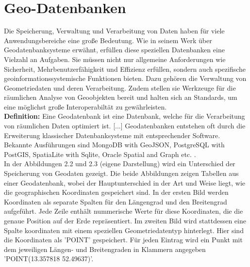 \section{Geo-Datenbanken}

Die Speicherung, Verwaltung und Verarbeitung von Daten haben für viele Anwendungsbereiche eine große Bedeutung.  Wie \cite{brinkhoff_geodatenbanksysteme_2022} in seinem Werk über Geodatenbanksysteme erwähnt, erfüllen diese speziellen Datenbanken eine Vielzahl an Aufgaben. Sie müssen nicht nur allgemeine Anforderungen wie Sicherheit, Mehrbenutzerfähigkeit und Effizienz erfüllen, sondern auch spezifische geoinformationssystemische Funktionen bieten. Dazu gehören die Verwaltung von Geometriedaten und deren Verarbeitung. Zudem stellen sie Werkzeuge für die räumlichen Analyse von Geoobjekten bereit und halten sich an Standards, um eine möglichst große Interoperabiltät zu gewährleisten. \\

\textbf{Definition: }Eine Geodatenbank ist eine Datenbank, welche für die Verarbeitung von räumlichen Daten optimiert ist. [...] Geodatenbanken entstehen oft durch die Erweiterung klassischer Datenbanksysteme mit entsprechender Software. Bekannte Ausführungen sind MongoDB with GeoJSON, PostgreSQL with PostGIS, SpatiaLite with Sqlite, Oracle Spatial and Graph etc. \citep{wiki-geodatenbank}.\\

In der Abbildungen 2.2 und 2.3 (eigene Darstellung) wird ein Unterschied der Speicherung von Geodaten gezeigt. Die beide Abbildungen zeigen Tabellen aus einer Geodatenbank, wobei der Hauptunterschied in der Art und Weise liegt, wie die geographischen Koordinaten gespeichert sind. In der ersten Bild werden Koordinaten als separate Spalten für den Längengrad und den Breitengrad aufgeführt. Jede Zeile enthält nummerische Werte für diese Koordinaten, die die genaue Position auf der Erde repräsentiert. Im zweiten Bild wird stattdessen eine Spalte koordinaten mit einem speziellen Geometriedatentyp hinterlegt. Hier sind die Koordinaten als 'POINT' gespeichert. Für jeden Eintrag wird ein Punkt mit dem jeweiligen Längen- und Breitengraden in Klammern angegeben 'POINT(13.357818 52.49637)'. \\

